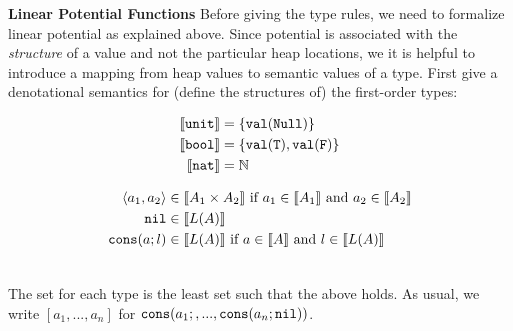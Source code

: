 \documentclass{easychair}
\newcommand{\irl}[1]{\mathtt{#1}}
\newcounter{rule}
\newcommand{\denote}[1]{\llbracket#1\rrbracket}
\newcommand{\val}[1]{\irl{val}(#1)}
\theoremstyle{definition}
\begin{document}
\textbf{Linear Potential Functions}
Before giving the type rules, we need to formalize linear potential as explained above.
Since potential is associated with the \emph{structure} of a value and not the particular heap 
locations, we it is helpful to introduce a mapping from
heap values to semantic values of a type. 
First give a denotational semantics for (define the structures of) the first-order types: 
  \begin{minipage}{0.4\linewidth}
\begin{align*}
	\denote{\unittyabt} &= \{\val{\irl{Null}}\}\\
	\denote{\booltyabt} &= \{\val{\irl{T}}, \val{\irl{F}}\}\\
	\denote{\irl{nat}} &= \mathbb{N}\\
\end{align*}
  \end{minipage}%
\begin{minipage}{0.6\linewidth}
\begin{align*}
\pairexcst{a_1}{a_2} &\in \denote{\prodtycst{A_1}{A_2}} 
	\text{ if } a_1 \in \denote{A_1} \text{ and } a_2 \in \denote{A_2}\\
\nilexcst &\in \denote{L(A)}\\
\consexcst{a}{l} &\in \denote{L(A)} \text{ if } a \in \denote{A} \text{ and } l \in \denote{L(A)}\\
\end{align*}
  \end{minipage}\\
The set for each type is the least set such that the above holds. As usual, we write $[a_1,...,a_n]$ for ${\mathtt{cons}}\mathtt{(}{a_1;,...,{\mathtt{cons}}\mathtt{(}{a_n;\mathtt{nil}}\mathtt{)}}\mathtt{)}$.
\end{document}
